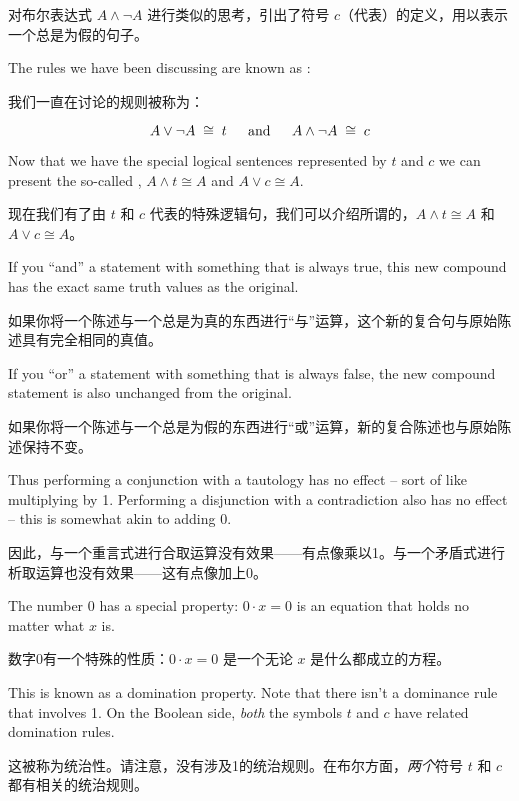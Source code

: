 对布尔表达式 $A \land {\lnot}A$ 进行类似的思考，引出了符号 $c$（代表）的定义，用以表示一个总是为假的句子。

The rules we have been discussing are known as 
:

我们一直在讨论的规则被称为：

\[ A \lor {\lnot}A \; \cong \; t \mbox{\rule{12pt}{0pt} and \rule{12pt}{0pt}}
A \land {\lnot}A \; \cong \; c \]


Now that we have the special logical sentences represented by $t$ and $c$
we can present the so-called , 
$A \land t \cong A$ and
$A \lor c \cong A$.

现在我们有了由 $t$ 和 $c$ 代表的特殊逻辑句，我们可以介绍所谓的，$A \land t \cong A$ 和 $A \lor c \cong A$。

If you ``and'' a statement with something that is always
true, this new compound has the exact same truth values as the original.

如果你将一个陈述与一个总是为真的东西进行“与”运算，这个新的复合句与原始陈述具有完全相同的真值。

If you ``or'' a statement with something that is always false, the new compound
statement is also unchanged from the original.

如果你将一个陈述与一个总是为假的东西进行“或”运算，新的复合陈述也与原始陈述保持不变。

Thus performing a 
conjunction with a tautology has no effect -- sort of like multiplying by 1.
Performing a disjunction with a contradiction also has no effect -- this is
somewhat akin to adding 0. 

因此，与一个重言式进行合取运算没有效果——有点像乘以1。与一个矛盾式进行析取运算也没有效果——这有点像加上0。

The number 0 has a special property: $0 \cdot x = 0$ is an equation that 
holds no matter what $x$ is.

数字0有一个特殊的性质：$0 \cdot x = 0$ 是一个无论 $x$ 是什么都成立的方程。

This is known as a domination property.  Note 
that there isn't a dominance rule that involves 1.
 On the Boolean side, 
{\em both} the symbols $t$ and $c$ have related domination rules.

这被称为统治性。请注意，没有涉及1的统治规则。在布尔方面，{\em 两个}符号 $t$ 和 $c$ 都有相关的统治规则。

